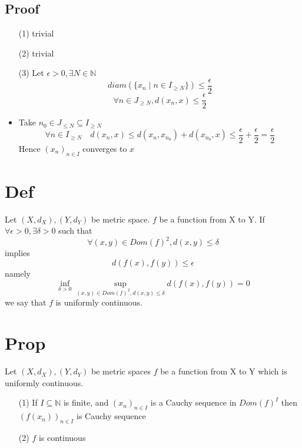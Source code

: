 \documentclass{book}
\begin{document}
\subsection{Proof}
\begin{itemize}
    \item [(1)]trivial
    \item [(2)]trivial
    \item [(3)]Let $\epsilon>0,\exists N\in \mathbb{N} $$$diam(\{x_n\mid n\in I_{\geq N}\})\leq\frac{\epsilon}{2}$$$$\forall n\in J_{\geq N},d(x_n,x)\leq\frac{\epsilon}{2}$$
    \item Take $n_0\in J_{\leq N}\subseteq I_{\geq N}$$$\forall n\in I_{\geq N}\quad d(x_n,x)\leq d(x_n,x_{n_0})+d(x_{n_0},x)\leq\frac{\epsilon}{2}+\frac{\epsilon}{2}=\frac{\epsilon}{2}$$ Hence $(x_n)_{n\in I}$ converges to $x$
\end{itemize}
\section{Def}
Let $(X,d_X),(Y,d_Y)$ be metric space. $f$ be a function from X to Y. If $\forall \epsilon>0,\exists \delta >0$ such that $$\forall(x,y)\in Dom(f)^2,d(x,y)\leq\delta$$implies$$d(f(x),f(y))\leq\epsilon$$ namely$$\inf\limits_{\delta>0}\sup\limits_{(x,y)\in Dom (f)^2, d(x,y)\leq\delta}d(f(x),f(y))=0$$ we say that $f$ is uniformly continuous.
\section{Prop}
Let $(X,d_X),(Y,d_Y)$ be metric spaces $f$ be a function from X to Y which is uniformly continuous.
\begin{itemize}
    \item [(1)]If $I\subseteq \mathbb{N} $ is finite, and $(x_n)_{n\in I}$ is a Cauchy sequence in $Dom(f)^I$ then $(f(x_n))_{n\in I}$ is Cauchy sequence
    \item[(2)] $f$ is continuous
\end{itemize} 
\end{document}
